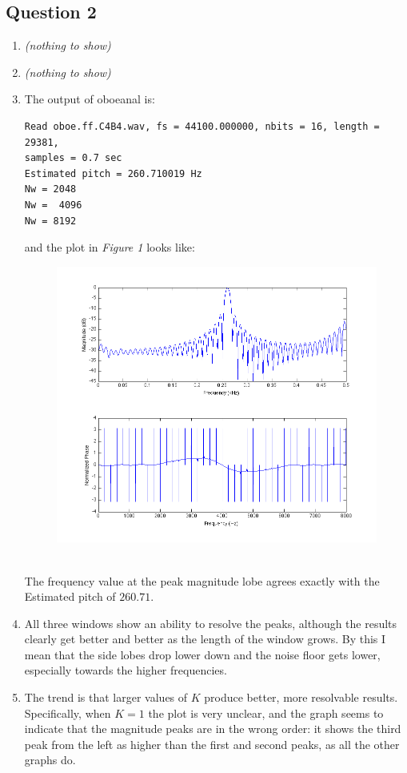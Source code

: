 \documentclass[11pt]{article}
\begin{document}
\subsection*{Question 2}
\begin{enumerate}
\item \emph{(nothing to show)}
\item \emph{(nothing to show)}
\item The output of oboeanal is:
\begin{verbatim}
Read oboe.ff.C4B4.wav, fs = 44100.000000, nbits = 16, length = 29381,
samples = 0.7 sec
Estimated pitch = 260.710019 Hz
Nw = 2048
Nw =  4096
Nw = 8192
\end{verbatim}
\newpage
and the plot in \emph{Figure 1} looks like:
\begin{figure}[!h]
\includegraphics[scale=.7]{p2c}
\end{figure} \\
The frequency value at the peak magnitude lobe agrees exactly with the Estimated pitch of $260.71$.

\item All three windows show an ability to resolve the peaks, although the results clearly get better and better as the length of the window grows. By this I mean that the side lobes drop lower down and the noise floor gets lower, especially towards the higher frequencies.

\item The trend is that larger values of $K$ produce better, more resolvable results. Specifically, when $K=1$ the plot is very unclear, and the graph seems to indicate that the magnitude peaks are in the wrong order: it shows the third peak from the left as higher than the first and second peaks, as all the other graphs do.

\end{enumerate}
\end{document}
